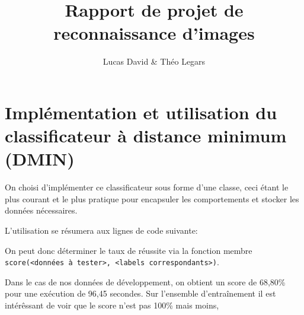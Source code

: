 \documentclass[12pt,a4paper]{article}
\author{Lucas David \& Théo Legars}
\title{Rapport de projet de reconnaissance d'images}
\date{}
\begin{document}
\maketitle

\section{Implémentation et utilisation du classificateur à distance minimum (DMIN)}

On choisi d'implémenter ce classificateur sous forme d'une classe, ceci étant le plus courant et le plus pratique pour encapsuler les comportements et stocker les données nécessaires.


L'utilisation se résumera aux lignes de code suivante:


On peut donc déterminer le taux de réussite via la fonction membre \lstinline|score(<données à tester>, <labels correspondants>)|.

Dans le cas de nos données de développement, on obtient un score de 68,80\% pour une exécution de 96,45 secondes.
Sur l'ensemble d'entraînement il est intérêssant de voir que le score n'est pas 100\% mais moins,
\end{document}
